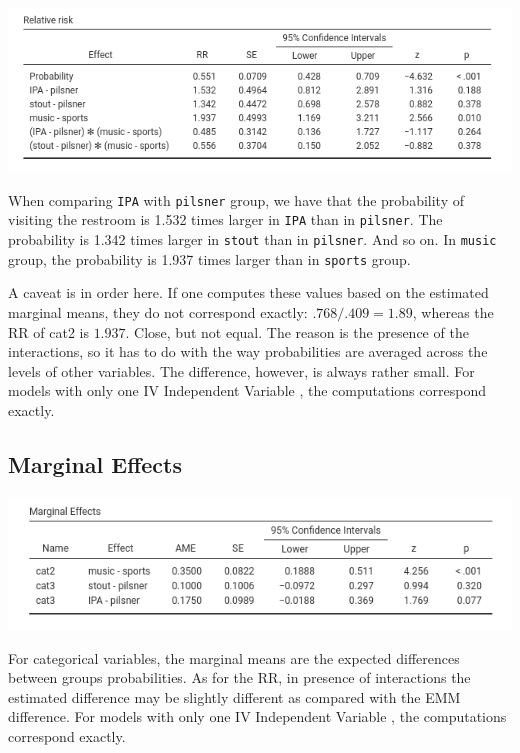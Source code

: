 \documentclass[
]{book}
\begin{document}
\includegraphics[width=9.08in]{bookletpics/3_logistic_output10}

When comparing \texttt{IPA} with \texttt{pilsner} group, we have that the probability of visiting the restroom is 1.532 times larger in \texttt{IPA} than in \texttt{pilsner}. The probability is 1.342 times larger in \texttt{stout} than in \texttt{pilsner}. And so on. In \texttt{music} group, the probability is 1.937 times larger than in \texttt{sports} group.

A caveat is in order here. If one computes these values based on the estimated marginal means, they do not correspond exactly: \(.768/.409=1.89\), whereas the RR of cat2 is \(1.937\). Close, but not equal. The reason is the presence of the interactions, so it has to do with the way probabilities are averaged across the levels of other variables. The difference, however, is always rather small. For models with only one {IV {Independent Variable} }, the computations correspond exactly.

\hypertarget{logisticcatmarginal}{%
\subsection{Marginal Effects}\label{logisticcatmarginal}}

\includegraphics[width=8.56in]{bookletpics/3_logistic_output11}

For categorical variables, the marginal means are the expected differences between groups probabilities. As for the RR, in presence of interactions the estimated difference may be slightly different as compared with the EMM difference. For models with only one {IV {Independent Variable} }, the computations correspond exactly.
\end{document}
